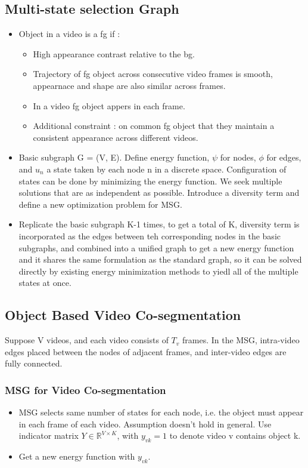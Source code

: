 \documentclass{article}
\begin{document}
\subsection{Multi-state selection Graph}
\begin{itemize}
\item Object in a video is a fg if :
  \begin{itemize}
  \item High appearance contrast relative to the bg.
  \item Trajectory of fg object across consecutive video frames is smooth, appearnace and shape are also similar across frames.
  \item In a video fg object appers in each frame.
  \item Additional constraint : on common fg object that they maintain a consistent appearance across different videos.
  \end{itemize}
\item Basic subgraph G = (V, E). Define energy function, $\psi$ for nodes, $\phi$ for edges, and $u_n$ a state taken by each node n in a discrete space. Configuration of states can be done by minimizing the energy function. We seek multiple solutions that are as independent as possible. Introduce a diversity term and define a new optimization problem for MSG.
\item Replicate the basic subgraph K-1 times, to get a total of K, diversity term is incorporated as the edges between teh corresponding nodes in the basic subgraphs, and combined into a unified graph to get a new energy function and it shares the same formulation as the standard graph, so it can be solved directly by existing energy minimization methods to yiedl all of the multiple states at once.
\end{itemize}

\subsection{Object Based Video Co-segmentation}
Suppose V videos, and each video consists of $T_v$ frames. In the MSG, intra-video edges placed between the nodes of adjacent frames, and inter-video edges are fully connected.

\subsubsection{MSG for Video Co-segmentation}
\begin{itemize}
\item MSG selects same number of states for each node, i.e. the object must appear in each frame of each video. Assumption doesn't hold in general. Use indicator matrix $Y \in \mathbb{R}^{V \times K}$, with $y_{vk} = 1$ to denote video v contains object k.
\item Get a new energy function with $y_{vk}$.
\end{itemize}
\end{document}
